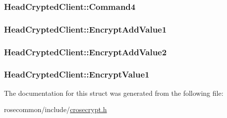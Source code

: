 \subsubsection[{\texorpdfstring{Command4}{Command4}}]{ Head\+Crypted\+Client\+::\+Command4}\hypertarget{structHeadCryptedClient_a1cfcf027682f486f3fecf1ae01df43e7}{}\label{structHeadCryptedClient_a1cfcf027682f486f3fecf1ae01df43e7}
\subsubsection[{\texorpdfstring{Encrypt\+Add\+Value1}{EncryptAddValue1}}]{ Head\+Crypted\+Client\+::\+Encrypt\+Add\+Value1}\hypertarget{structHeadCryptedClient_aa331779a9e406430ab74ea527da77e30}{}\label{structHeadCryptedClient_aa331779a9e406430ab74ea527da77e30}
\subsubsection[{\texorpdfstring{Encrypt\+Add\+Value2}{EncryptAddValue2}}]{ Head\+Crypted\+Client\+::\+Encrypt\+Add\+Value2}\hypertarget{structHeadCryptedClient_ac213159112b8f60aa4b68b55b2ee7080}{}\label{structHeadCryptedClient_ac213159112b8f60aa4b68b55b2ee7080}
\subsubsection[{\texorpdfstring{Encrypt\+Value1}{EncryptValue1}}]{ Head\+Crypted\+Client\+::\+Encrypt\+Value1}\hypertarget{structHeadCryptedClient_a71f4e050ac9070bbf765bf5050278ee9}{}\label{structHeadCryptedClient_a71f4e050ac9070bbf765bf5050278ee9}


The documentation for this struct was generated from the following file\+:\begin{DoxyCompactItemize}
\item 
rosecommon/include/\hyperlink{crosecrypt_8h}{crosecrypt.\+h}\end{DoxyCompactItemize}
